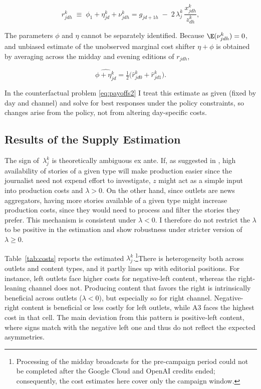 \documentclass[12pt]{article}
\begin{document}
\[
r_{jdh}^k \;\equiv\;\phi_1+\eta_{jd}^k+ \nu_{jdh}^k= {{g}_{jd+1h}} \;-\; 2\,{{\lambda}}_j^k\,\frac{x_{jdh}^k}{z_{dh}^k} ,
\]


The parameters $\phi$ and $\eta$ cannot be separately identified. Because $\E(\nu_{jdh}^k)=0$, and unbiased estimate of the unobserved marginal cost shifter $\eta + \phi$ is obtained by averaging across the midday and evening editions of $r_{jdh}$,


\[
\widehat{\phi +\eta_{jd}^k} = \tfrac{1}{2}\big(\hat{r}_{jd0}^k+\hat{r}_{jd1}^k\big).
\]


In the counterfactual problem \eqref{eq:payoffs2} I treat this estimate  as given (fixed by day and channel) and solve for best responses under the policy constraints, so changes arise from the policy, not from altering day-specific costs.



\subsection{Results of the Supply Estimation}

 The sign of~$\lambda_j^k$ is theoretically ambiguous ex ante. If, as suggested in \cite{SimonovRao2022}, high availability of stories of a given type will make production easier since the journalist need not expend effort to investigate,  $z$ might act as a simple input into production costs and $ \lambda>0$. On the other hand, since outlets are news aggregators, having more stories available of a given type might increase production costs, since they would need to process and filter the stories they prefer. This mechanism is consistent under $ \lambda<0$. I therefore do not restrict the $\lambda$ to be positive in the estimation and show robustness under stricter version of $\lambda \geq0$.


Table~\ref{tab:costs} reports the estimated $\lambda_j^k$.\footnote{Processing of the midday broadcasts for the pre‑campaign period could not be completed after the Google Cloud and OpenAI credits ended; consequently, the cost estimates here cover only the campaign window. }There is heterogeneity both  across outlets and content types, and it partly lines up with editorial positions. For instance, left outlets face higher costs for negative-left content, whereas the right-leaning channel does not. Producing content that favors the right is intrinsically beneficial across outlets ($\lambda<0$), but especially so for right channel. Negative-right content is beneficial or less costly for left outlets, while A3 faces the highest cost in that cell. The main deviation from this pattern is positive-left content, where signs match with the negative left one and thus do not reflect the expected asymmetries. 
\end{document}
